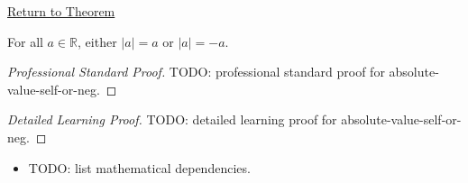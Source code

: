 \newpage
{}
\label{prf:absolute-value-self-or-neg}

\begin{remark*}[Return]
\hyperref[thm:absolute-value-self-or-neg]{Return to Theorem}
\end{remark*}

\begin{theorem*}
For all $a \in \mathbb{R}$, either $\lvert a \rvert = a$ or
$\lvert a \rvert = -a$.
\end{theorem*}

\begin{proof}[Professional Standard Proof]
\LRAProofBodyStart
TODO: professional standard proof for absolute-value-self-or-neg.
\end{proof}

\begin{proof}[Detailed Learning Proof]
\LRAProofBodyStart
TODO: detailed learning proof for absolute-value-self-or-neg.
\end{proof}

\begin{remark*}
\end{remark*}

\begin{dependencies}
\begin{itemize}
  \item TODO: list mathematical dependencies.
\end{itemize}
\end{dependencies}

\clearpage
